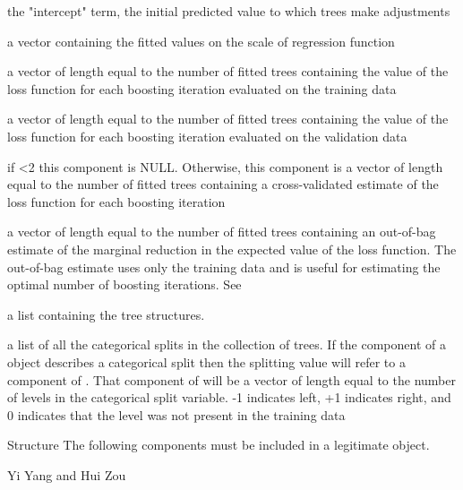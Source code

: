 \documentclass[a4paper]{book}
\begin{document}
\begin{Value}
\begin{ldescription}
\item[\code{initF}] the "intercept" term, the initial predicted value to which trees
make adjustments
\item[\code{fit}] a vector containing the fitted values on the scale of regression
function
\item[\code{train.error}] a vector of length equal to the number of fitted trees
containing the value of the loss function for each boosting iteration
evaluated on the training data
\item[\code{valid.error}] a vector of length equal to the number of fitted trees
containing the value of the loss function for each boosting iteration
evaluated on the validation data
\item[\code{cv.error}] if <2 this component is NULL. Otherwise, this 
component is a vector of length equal to the number of fitted trees
containing a cross-validated estimate of the loss function for each boosting 
iteration
\item[\code{oobag.improve}] a vector of length equal to the number of fitted trees
containing an out-of-bag estimate of the marginal reduction in the expected
value of the loss function. The out-of-bag estimate uses only the training
data and is useful for estimating the optimal number of boosting iterations.
See 
\item[\code{trees}] a list containing the tree structures.
\item[\code{c.splits}] a list of all the categorical splits in the collection of
trees. If the  component of a  object describes a
categorical split then the splitting value will refer to a component of
. That component of  will be a vector of length
equal to the number of levels in the categorical split variable. -1 indicates
left, +1 indicates right, and 0 indicates that the level was not present in the
training data
\end{ldescription}
\end{Value}
%
\begin{Section}{Structure}
The following components must be included in a legitimate  object.
\end{Section}
%
\begin{Author}\relax
Yi Yang  and Hui Zou 
\end{Author}
\end{document}
